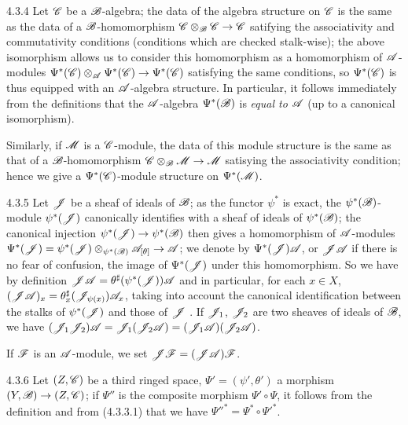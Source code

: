 \begin{env}{4.3.4}
\label{env-0.4.3.4}
Let $\mathscr{C}$ be a $\mathscr{B}$-algebra; the data of the algebra structure on
$\mathscr{C}$ is the same as the data of a $\mathscr{B}$-homomorphism
$\mathscr{C}\otimes_\mathscr{B}\mathscr{C}\to\mathscr{C}$ satifying the associativity and
commutativity conditions (conditions which are checked stalk-wise); the above
isomorphism allows us to consider this homomorphism as a homomorphism of
$\mathscr{A}$-modules $\Psi^*(\mathscr{C})\otimes_\mathscr{A}\Psi^*(\mathscr{C})\to\Psi^*(\mathscr{C})$
satisfying the same conditions, so $\Psi^*(\mathscr{C})$ is thus equipped with an
$\mathscr{A}$-algebra structure. In particular, it follows immediately from the
definitions that the $\mathscr{A}$-algebra $\Psi^*(\mathscr{B})$ is \emph{equal to
$\mathscr{A}$} (up to a canonical isomorphism).

Similarly, if $\mathscr{M}$ is a $\mathscr{C}$-module, the data of this module structure
is the same
as that of a $\mathscr{B}$-homomorphism $\mathscr{C}\otimes_\mathscr{B}\mathscr{M}\to\mathscr{M}$
satisying the associativity condition; hence we give a $\Psi^*(\mathscr{C})$-module
structure on $\Psi^*(\mathscr{M})$.
\end{env}

\begin{env}{4.3.5}
\label{env-0.4.3.5}
Let $\mathscr{J}$ be a sheaf of ideals of $\mathscr{B}$; as the functor $\psi^*$ is exact,
the $\psi^*(\mathscr{B})$-module $\psi^*(\mathscr{J})$ canonically identifies with a sheaf
of ideals of $\psi^*(\mathscr{B})$; the canonical injection
$\psi^*(\mathscr{J})\to\psi^*(\mathscr{B})$ then gives a homomorphism of $\mathscr{A}$-modules
$\Psi^*(\mathscr{J})=\psi^*(\mathscr{J})\otimes_{\psi^*(\mathscr{B})}\mathscr{A}_{[\theta]}
  \to\mathscr{A}$; we denote by $\Psi^*(\mathscr{J})\mathscr{A}$, or $\mathscr{J}\mathscr{A}$ if there is
no fear of confusion, the image of $\Psi^*(\mathscr{J})$ under this homomorphism. So
we have by definition $\mathscr{J}\mathscr{A}=\theta^\sharp(\psi^*(\mathscr{J}))\mathscr{A}$ and in
particular, for each $x\in X$,
$(\mathscr{J}\mathscr{A})_x=\theta_x^\sharp(\mathscr{J}_{\psi(x)})\mathscr{A}_x$, taking into
account the canonical identification between the stalks of $\psi^*(\mathscr{J})$ and
those of $\mathscr{J}$ . If $\mathscr{J}_1$, $\mathscr{J}_2$ are two sheaves
of ideals of $\mathscr{B}$, we have
$(\mathscr{J}_1\mathscr{J}_2)\mathscr{A}
  =\mathscr{J}_1(\mathscr{J}_2\mathscr{A})=(\mathscr{J}_1\mathscr{A})(\mathscr{J}_2\mathscr{A})$.

If $\mathscr{F}$ is an $\mathscr{A}$-module, we set $\mathscr{J}\mathscr{F}=(\mathscr{J}\mathscr{A})\mathscr{F}$.
\end{env}

\begin{env}{4.3.6}
\label{env-0.4.3.6}
Let $(Z,\mathscr{C})$ be a third ringed space, $\Psi'=(\psi',\theta')$ a morphism
$(Y,\mathscr{B})\to(Z,\mathscr{C})$; if $\Psi''$ is the composite morphism
$\Psi'\circ\Psi$, it follows from the definition  and from
(4.3.3.1) that we have ${\Psi''}^*=\Psi^*\circ{\Psi'}^*$.
\end{env}

